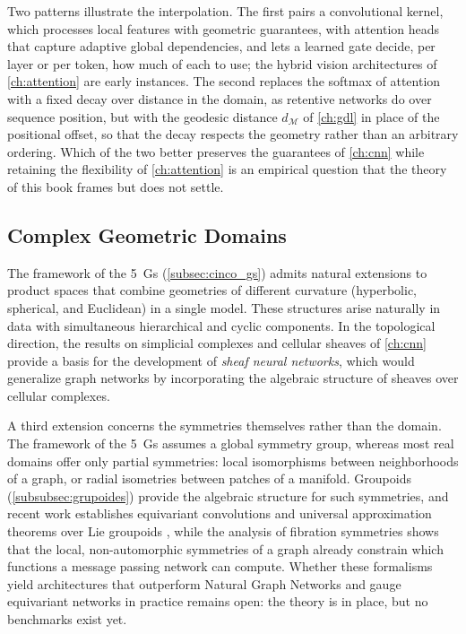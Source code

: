 Two patterns illustrate the interpolation. The first pairs a convolutional kernel, which processes local features with geometric guarantees, with attention heads that capture adaptive global dependencies, and lets a learned gate decide, per layer or per token, how much of each to use; the hybrid vision architectures of \autoref{ch:attention} are early instances. The second replaces the softmax of attention with a fixed decay over distance in the domain, as retentive networks do over sequence position, but with the geodesic distance $d_\mathcal{M}$ of \autoref{ch:gdl} in place of the positional offset, so that the decay respects the geometry rather than an arbitrary ordering. Which of the two better preserves the guarantees of \autoref{ch:cnn} while retaining the flexibility of \autoref{ch:attention} is an empirical question that the theory of this book frames but does not settle.

\subsection{Complex Geometric Domains}

The framework of the 5~Gs (\autoref{subsec:cinco_gs}) admits natural extensions to product spaces that combine geometries of different curvature (hyperbolic, spherical, and Euclidean) in a single model. These structures arise naturally in data with simultaneous hierarchical and cyclic components. In the topological direction, the results on simplicial complexes and cellular sheaves of \autoref{ch:cnn} provide a basis for the development of \textit{sheaf neural networks}, which would generalize graph networks by incorporating the algebraic structure of sheaves over cellular complexes.

A third extension concerns the symmetries themselves rather than the domain. The framework of the 5~Gs assumes a global symmetry group, whereas most real domains offer only partial symmetries: local isomorphisms between neighborhoods of a graph, or radial isometries between patches of a manifold. Groupoids (\autoref{subsubsec:grupoides}) provide the algebraic structure for such symmetries, and recent work establishes equivariant convolutions and universal approximation theorems over Lie groupoids \citep{astwood2026liegroupoid, maruyama2025categorical}, while the analysis of fibration symmetries \citep{velarde2026fibration} shows that the local, non-automorphic symmetries of a graph already constrain which functions a message passing network can compute. Whether these formalisms yield architectures that outperform Natural Graph Networks \citep{dehaan2020natural} and gauge equivariant networks in practice remains open: the theory is in place, but no benchmarks exist yet.

